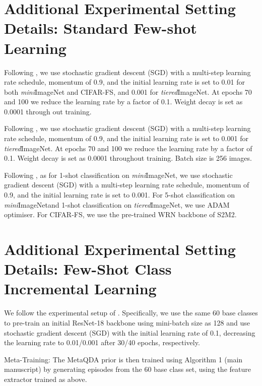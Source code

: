\documentclass[10pt,twocolumn,letterpaper]{article}
\def\tierIN{\textit{tiered}ImageNet}
\def\miniIN{\textit{mini}ImageNet}
\begin{document}
\section{Additional Experimental Setting Details: Standard Few-shot Learning}\label{sec:extraHypers}

Following \cite{wang2019simpleshot}, we use stochastic gradient descent (SGD) with a multi-step learning rate schedule, momentum of 0.9, and the initial learning rate is set to 0.01 for both {\miniIN} and CIFAR-FS, and 0.001 for \tierIN. At epochs 70 and 100 we reduce the learning rate by a factor of 0.1. Weight decay is set as 0.0001 through
out training. 

Following \cite{wang2019simpleshot}, we use stochastic gradient descent (SGD) with a multi-step learning rate schedule, momentum of 0.9, and the initial learning rate is set to 0.001 for \tierIN. At epochs 70 and 100 we reduce the learning rate by a factor of 0.1. Weight decay is set as 0.0001 throughout training. Batch size is 256 images.

Following \cite{mangla2020charting}, as for 1-shot classification on \miniIN, we use stochastic gradient descent (SGD) with a multi-step learning rate schedule, momentum of 0.9, and the initial learning rate is set to 0.001. For 5-shot classification on \miniIN and 1-shot classification on \tierIN, we use ADAM optimiser. For CIFAR-FS, we use the pre-trained WRN backbone of S2M2.

\section{Additional Experimental Setting Details: Few-Shot Class Incremental Learning}\label{sec:extraHypers}

 We follow the experimental setup of \cite{tao2020few}. Specifically, we use the same 60 base classes to pre-train an initial ResNet-18 backbone using mini-batch size as 128 and use stochastic gradient descent (SGD) with the initial learning rate of 0.1, decreasing the learning rate to 0.01/0.001 after 30/40 epochs, respectively.

Meta-Training: The MetaQDA prior is then trained using Algorithm 1 (main manuscript) by generating episodes from the 60 base class set, using the feature extractor trained as above. 
\end{document}
